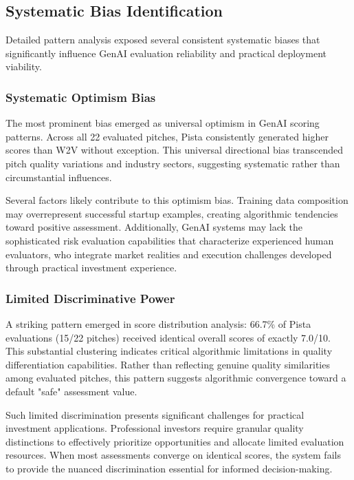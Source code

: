\subsection{Systematic Bias Identification}
\label{subsec:bias}

Detailed pattern analysis exposed several consistent systematic biases that significantly influence GenAI evaluation reliability and practical deployment viability.

\subsubsection{Systematic Optimism Bias}

The most prominent bias emerged as universal optimism in GenAI scoring patterns. Across all 22 evaluated pitches, Pista consistently generated higher scores than W2V without exception. This universal directional bias transcended pitch quality variations and industry sectors, suggesting systematic rather than circumstantial influences.

Several factors likely contribute to this optimism bias. Training data composition may overrepresent successful startup examples, creating algorithmic tendencies toward positive assessment. Additionally, GenAI systems may lack the sophisticated risk evaluation capabilities that characterize experienced human evaluators, who integrate market realities and execution challenges developed through practical investment experience.

\subsubsection{Limited Discriminative Power}

A striking pattern emerged in score distribution analysis: 66.7\% of Pista evaluations (15/22 pitches) received identical overall scores of exactly 7.0/10. This substantial clustering indicates critical algorithmic limitations in quality differentiation capabilities. Rather than reflecting genuine quality similarities among evaluated pitches, this pattern suggests algorithmic convergence toward a default "safe" assessment value.

Such limited discrimination presents significant challenges for practical investment applications. Professional investors require granular quality distinctions to effectively prioritize opportunities and allocate limited evaluation resources. When most assessments converge on identical scores, the system fails to provide the nuanced discrimination essential for informed decision-making.

